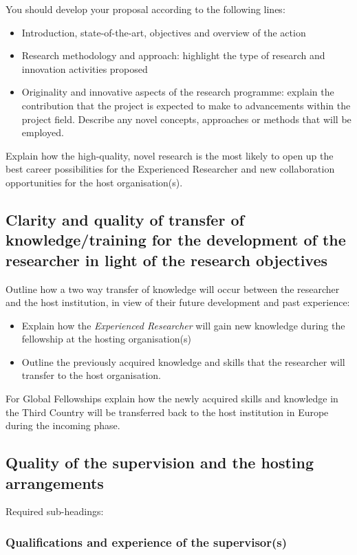 \documentclass[a4paper,11pt]{article}
\begin{document}
You should develop your proposal according to the following lines:
\begin{itemize}
\item Introduction, state-of-the-art, objectives and overview of the action
\item Research methodology and approach: highlight the type of research and innovation activities proposed
\item Originality and innovative aspects of the research programme: explain the contribution that the project is expected to make to advancements within the project field. Describe any novel concepts, approaches or methods that will be employed.
\end{itemize}
Explain how the high-quality, novel research is the most likely to open up the best career possibilities for the Experienced Researcher and new collaboration opportunities for the host organisation(s). 

\subsection{Clarity and quality of transfer of knowledge/training for the development of the researcher in light of the research objectives}
\label{sec:transfer}

Outline how a two way transfer of knowledge will occur between the researcher and the host institution, in view of their future development and past experience:
\begin{itemize}
\item Explain how the \emph{Experienced Researcher} will gain new knowledge during the fellowship at the hosting organisation(s)
\item Outline the previously acquired knowledge and skills that the researcher will transfer to the host organisation.
\end{itemize}
For Global Fellowships explain how the newly acquired skills and knowledge in the Third Country will be transferred back to the host institution in Europe during the incoming phase.

\subsection{Quality of the supervision and the hosting arrangements}
\label{sec:supervision}

Required sub-headings:

\subsubsection*{Qualifications and experience of the supervisor(s)}
\end{document}
